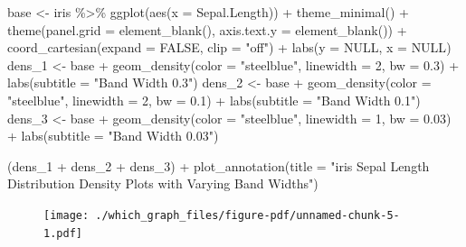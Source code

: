 \documentclass[
  letterpaper,
]{book}
\newenvironment{Shaded}{\begin{snugshade}}{\end{snugshade}}
\newcommand{\AttributeTok}[1]{\textcolor[rgb]{0.40,0.45,0.13}{#1}}
\newcommand{\ConstantTok}[1]{\textcolor[rgb]{0.56,0.35,0.01}{#1}}
\newcommand{\DecValTok}[1]{\textcolor[rgb]{0.68,0.00,0.00}{#1}}
\newcommand{\FloatTok}[1]{\textcolor[rgb]{0.68,0.00,0.00}{#1}}
\newcommand{\FunctionTok}[1]{\textcolor[rgb]{0.28,0.35,0.67}{#1}}
\newcommand{\NormalTok}[1]{\textcolor[rgb]{0.00,0.23,0.31}{#1}}
\newcommand{\OtherTok}[1]{\textcolor[rgb]{0.00,0.23,0.31}{#1}}
\newcommand{\SpecialCharTok}[1]{\textcolor[rgb]{0.37,0.37,0.37}{#1}}
\newcommand{\StringTok}[1]{\textcolor[rgb]{0.13,0.47,0.30}{#1}}
\begin{document}
\begin{Shaded}
\begin{Highlighting}[]
\NormalTok{base }\OtherTok{\textless{}{-}}\NormalTok{ iris }\SpecialCharTok{\%\textgreater{}\%} \FunctionTok{ggplot}\NormalTok{(}\FunctionTok{aes}\NormalTok{(}\AttributeTok{x =}\NormalTok{ Sepal.Length))  }\SpecialCharTok{+} \FunctionTok{theme\_minimal}\NormalTok{() }\SpecialCharTok{+} \FunctionTok{theme}\NormalTok{(}\AttributeTok{panel.grid =} \FunctionTok{element\_blank}\NormalTok{(), }\AttributeTok{axis.text.y =} \FunctionTok{element\_blank}\NormalTok{()) }\SpecialCharTok{+} 
  \FunctionTok{coord\_cartesian}\NormalTok{(}\AttributeTok{expand =} \ConstantTok{FALSE}\NormalTok{, }\AttributeTok{clip =} \StringTok{"off"}\NormalTok{) }\SpecialCharTok{+} \FunctionTok{labs}\NormalTok{(}\AttributeTok{y =} \ConstantTok{NULL}\NormalTok{, }\AttributeTok{x =} \ConstantTok{NULL}\NormalTok{)}
\NormalTok{dens\_1 }\OtherTok{\textless{}{-}}\NormalTok{ base }\SpecialCharTok{+} \FunctionTok{geom\_density}\NormalTok{(}\AttributeTok{color =} \StringTok{"steelblue"}\NormalTok{, }\AttributeTok{linewidth =} \DecValTok{2}\NormalTok{, }\AttributeTok{bw =} \FloatTok{0.3}\NormalTok{) }\SpecialCharTok{+} \FunctionTok{labs}\NormalTok{(}\AttributeTok{subtitle =} \StringTok{"Band Width 0.3"}\NormalTok{)}
\NormalTok{dens\_2 }\OtherTok{\textless{}{-}}\NormalTok{ base }\SpecialCharTok{+} \FunctionTok{geom\_density}\NormalTok{(}\AttributeTok{color =} \StringTok{"steelblue"}\NormalTok{, }\AttributeTok{linewidth =} \DecValTok{2}\NormalTok{, }\AttributeTok{bw =} \FloatTok{0.1}\NormalTok{) }\SpecialCharTok{+} \FunctionTok{labs}\NormalTok{(}\AttributeTok{subtitle =} \StringTok{"Band Width 0.1"}\NormalTok{)}
\NormalTok{dens\_3 }\OtherTok{\textless{}{-}}\NormalTok{ base }\SpecialCharTok{+} \FunctionTok{geom\_density}\NormalTok{(}\AttributeTok{color =} \StringTok{"steelblue"}\NormalTok{, }\AttributeTok{linewidth =} \DecValTok{1}\NormalTok{, }\AttributeTok{bw =} \FloatTok{0.03}\NormalTok{) }\SpecialCharTok{+} \FunctionTok{labs}\NormalTok{(}\AttributeTok{subtitle =} \StringTok{"Band Width 0.03"}\NormalTok{)}

\NormalTok{(dens\_1 }\SpecialCharTok{+}\NormalTok{ dens\_2 }\SpecialCharTok{+}\NormalTok{ dens\_3) }\SpecialCharTok{+} \FunctionTok{plot\_annotation}\NormalTok{(}\AttributeTok{title =} \StringTok{"iris Sepal Length Distribution Density Plots with Varying Band Widths"}\NormalTok{)}
\end{Highlighting}
\end{Shaded}

\begin{figure}[H]

{\centering \texttt{[image: ./which\_graph\_files/figure-pdf/unnamed-chunk-5-1.pdf]}

}

\end{figure}
\end{document}
